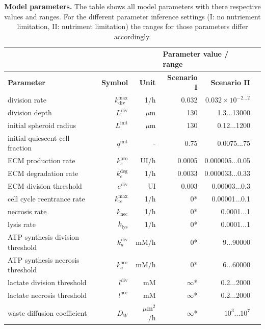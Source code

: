 \documentclass[10pt,letterpaper]{article}
\newcommand{\jh}[1]{{\color{red}#1}}
\newcommand{\sI}[1]{{\color{red}#1}}
\newcommand{\sII}[1]{{\color{blue}#1}}
\begin{document}
\begin{table}[!ht]
\begin{adjustwidth}{-0.5in}{0in} %
\caption{
{\bf Model parameters.} The table shows all model parameters with there respective values and ranges. For the different parameter inference settings (I: no nutriement limitation, II: nutriment limitation) the ranges for those parameters differ accordingly. }
\begin{tabular}{|p{6cm}|r|r|r|r|r|}
\hline
\multicolumn{3}{|l|}{\bf } & \multicolumn{2}{|l|}{\bf Parameter value / range}\\ \hline
{\bf Parameter} 					&{\bf Symbol} &{\bf Unit} &\sI{\bf Scenario I} &\sII{\bf Scenario II}\\ \hline
division rate 					&$k_{\text{div}}^{\max}$ & 1/h & 0.032 & $0.032 \times 10^{-2...2}$\\ \hline
division depth 					&$L^{\text{div}}$ & $\mu$m & 130 & 1.3...13000\\ \hline
initial spheroid radius 			&$L^{\text{init}}$ & $\mu$m & 130 & 0.12...1200\\ \hline
initial quiescent cell fraction 		& $q^{\text{init}}$ &-& 0.75& 0.0075...75\\ \hline
ECM production rate 			&$k_{e}^{\text{pro}}$  & \jh{UI}/h&0.0005 &0.000005...0.05\\ \hline
ECM degradation rate 			&$k_{e}^{\text{deg}}$ &1/h&0.0033 &0.000033...0.33\\ \hline
ECM division threshold 			&$e^{\text{div}}$ &\jh{UI} &0.003 &0.00003...0.3\\ \hline
\hline
cell cycle reentrance rate 			&$k^{\max}_{\text{re}}$ &1/h &0*&0.00001...0.1\\ \hline
necrosis rate 					&$k_{\text{nec}}$ &1/h&0*&0.0001...1\\ \hline
lysis rate 						&$k_{\text{lys}}$ &1/h&0*&0.0001...1\\ \hline
ATP synthesis division threshold 			&$k_a^{\text{div}}$ &mM/h& 0*& 9...90000\\ \hline
ATP synthesis necrosis threshold 			&$k_a^{\text{nec}}$ &mM/h& 0*& 6...60000\\ \hline
lactate division threshold 			&$l^{\text{div}}$  &mM&$\infty$* & 0.2...2000\\ \hline
lactate necrosis threshold 			&$l^{\text{nec}}$ &mM &$\infty$* & 0.2...2000\\ \hline
waste diffusion coefficient 			&$D_W$& $\mu$m$^{2}$/h&$\infty$*& $10^{3}...10^{7}$\\ \hline

\end{tabular}
\end{adjustwidth}
\end{table}
\end{document}
